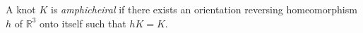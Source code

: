 A knot $K$ is \textit{amphicheiral} if there exists an orientation reversing homeomorphism $h$ of $\mathbb{R}^3$ onto itself such that $hK = K$.
